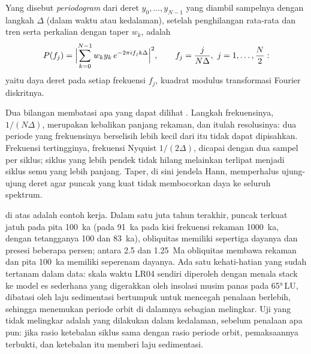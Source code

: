 \begin{definition}[Periodogram]\label{def:b3:sequence-stratigraphy:periodogram}
Yang disebut \emph{periodogram} dari deret $y_0, \dots, y_{N-1}$
yang diambil sampelnya dengan langkah $\Delta$ (dalam waktu atau kedalaman), setelah penghilangan rata-rata
dan tren serta perkalian dengan taper $w_k$, adalah
\[
P(f_j) = \Bigl|\sum_{k=0}^{N-1} w_k y_k\, e^{-2\pi i f_j k\Delta}\Bigr|^2,
\qquad f_j = \frac{j}{N\Delta},\ j = 1, \dots, \frac N2:
\]
yaitu daya deret pada setiap frekuensi $f_j$, kuadrat modulus
transformasi Fourier diskritnya.
\end{definition}

Dua bilangan membatasi apa yang dapat dilihat . Langkah frekuensinya, $1/(N\Delta)$,
merupakan kebalikan panjang rekaman, dan itulah resolusinya: dua periode yang frekuensinya
berselisih lebih kecil dari itu tidak dapat dipisahkan. Frekuensi tertingginya, frekuensi Nyquist $1/(2\Delta)$,
dicapai dengan dua sampel per siklus; siklus yang lebih pendek tidak hilang melainkan
terlipat menjadi siklus semu yang lebih panjang. Taper, di sini jendela Hann,
memperhalus ujung-ujung deret agar puncak yang kuat
tidak membocorkan daya ke seluruh spektrum.


 di atas adalah contoh kerja. Dalam satu juta tahun terakhir, puncak terkuat
jatuh pada pita \qty{100}{ka} (pada \qty{91}{ka} pada kisi frekuensi
rekaman \qty{1000}{ka}, dengan tetangganya 100 dan \qty{83}{ka}),
obliquitas memiliki sepertiga dayanya dan presesi beberapa persen;
antara 2.5 dan \qty{1.25}{Ma} obliquitas membawa rekaman dan
pita \qty{100}{ka} memiliki seperenam dayanya. Ada satu kehati-hatian yang sudah tertanam dalam
data: skala waktu LR04 sendiri diperoleh dengan menala stack ke
model es sederhana yang digerakkan oleh insolasi musim panas pada \ang{65}\,LU,
dibatasi oleh laju sedimentasi bertumpuk untuk mencegah penalaan berlebih, sehingga
menemukan periode orbit di dalamnya sebagian melingkar. Uji yang tidak melingkar
adalah yang dilakukan dalam kedalaman, sebelum penalaan apa pun: jika rasio ketebalan siklus
sama dengan rasio periode orbit, pemaksaannya terbukti, dan ketebalan itu memberi
laju sedimentasi.

